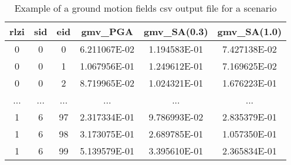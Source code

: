 \begin{table}[htbp]
\centering
\begin{tabular}{cccccc}

\hline
\rowcolor{lightgray}
\textbf{rlzi} & \textbf{sid} & \textbf{eid} & \textbf{gmv\_PGA} & \textbf{gmv\_SA(0.3)} & \textbf{gmv\_SA(1.0)} \\
\hline
0 & 0 & 0 & 6.211067E-02 & 1.194583E-01 & 7.427138E-02 \\
0 & 0 & 1 & 1.067956E-01 & 1.249612E-01 & 7.169625E-02 \\
0 & 0 & 2 & 8.719965E-02 & 1.024321E-01 & 1.676223E-01 \\
... & ... & ... & ... & ... & ... \\
1 & 6 & 97 & 2.317334E-01 & 9.786993E-02 & 2.835379E-01 \\
1 & 6 & 98 & 3.173075E-01 & 2.689785E-01 & 1.057350E-01 \\
1 & 6 & 99 & 5.139579E-01 & 3.395610E-01 & 2.365834E-01 \\
\hline

\end{tabular}
\caption{Example of a ground motion fields csv output file for a scenario}
\label{output:gmf_scenario}
\end{table}